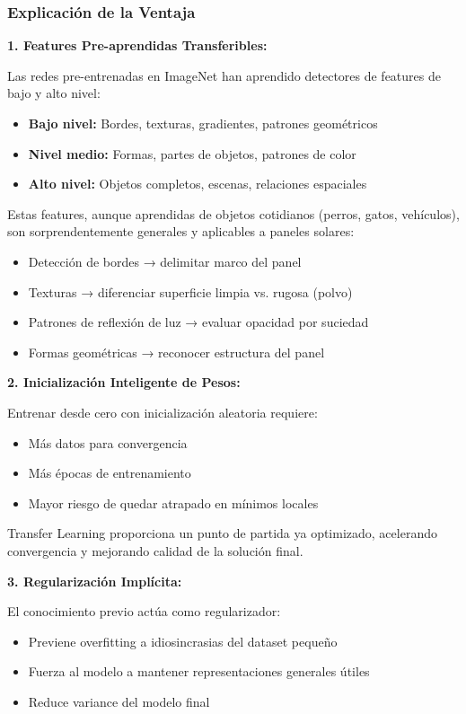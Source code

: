 \documentclass[11pt, a4paper]{article}
\begin{document}
\subsubsection{Explicación de la Ventaja}

\textbf{1. Features Pre-aprendidas Transferibles:}

Las redes pre-entrenadas en ImageNet han aprendido detectores de features de bajo y alto nivel:
\begin{itemize}
    \item \textbf{Bajo nivel:} Bordes, texturas, gradientes, patrones geométricos
    \item \textbf{Nivel medio:} Formas, partes de objetos, patrones de color
    \item \textbf{Alto nivel:} Objetos completos, escenas, relaciones espaciales
\end{itemize}

Estas features, aunque aprendidas de objetos cotidianos (perros, gatos, vehículos), son sorprendentemente generales y aplicables a paneles solares:
\begin{itemize}
    \item Detección de bordes → delimitar marco del panel
    \item Texturas → diferenciar superficie limpia vs. rugosa (polvo)
    \item Patrones de reflexión de luz → evaluar opacidad por suciedad
    \item Formas geométricas → reconocer estructura del panel
\end{itemize}

\textbf{2. Inicialización Inteligente de Pesos:}

Entrenar desde cero con inicialización aleatoria requiere:
\begin{itemize}
    \item Más datos para convergencia
    \item Más épocas de entrenamiento
    \item Mayor riesgo de quedar atrapado en mínimos locales
\end{itemize}

Transfer Learning proporciona un punto de partida ya optimizado, acelerando convergencia y mejorando calidad de la solución final.

\textbf{3. Regularización Implícita:}

El conocimiento previo actúa como regularizador:
\begin{itemize}
    \item Previene overfitting a idiosincrasias del dataset pequeño
    \item Fuerza al modelo a mantener representaciones generales útiles
    \item Reduce variance del modelo final
\end{itemize}
\end{document}
